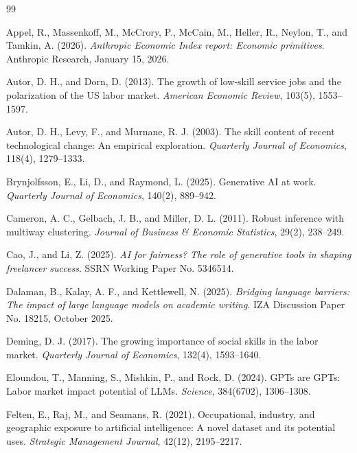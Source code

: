 \documentclass[11pt]{amsart}
\begin{document}
\FloatBarrier
\begin{thebibliography}{99}

Appel, R., Massenkoff, M., McCrory, P., McCain, M., Heller, R., Neylon, T., and Tamkin, A. (2026). \emph{Anthropic Economic Index report: Economic primitives}. Anthropic Research, January 15, 2026.

Autor, D. H., and Dorn, D. (2013). The growth of low-skill service jobs and the polarization of the US labor market. \emph{American Economic Review}, 103(5), 1553--1597.

Autor, D. H., Levy, F., and Murnane, R. J. (2003). The skill content of recent technological change: An empirical exploration. \emph{Quarterly Journal of Economics}, 118(4), 1279--1333.

Brynjolfsson, E., Li, D., and Raymond, L. (2025). Generative AI at work. \emph{Quarterly Journal of Economics}, 140(2), 889--942.

Cameron, A. C., Gelbach, J. B., and Miller, D. L. (2011). Robust inference with multiway clustering. \emph{Journal of Business \& Economic Statistics}, 29(2), 238--249.

Cao, J., and Li, Z. (2025). \emph{AI for fairness? The role of generative tools in shaping freelancer success}. SSRN Working Paper No. 5346514.

Dalaman, B., Kalay, A. F., and Kettlewell, N. (2025). \emph{Bridging language barriers: The impact of large language models on academic writing}. IZA Discussion Paper No. 18215, October 2025.

Deming, D. J. (2017). The growing importance of social skills in the labor market. \emph{Quarterly Journal of Economics}, 132(4), 1593--1640.

Eloundou, T., Manning, S., Mishkin, P., and Rock, D. (2024). GPTs are GPTs: Labor market impact potential of LLMs. \emph{Science}, 384(6702), 1306--1308.

Felten, E., Raj, M., and Seamans, R. (2021). Occupational, industry, and geographic exposure to artificial intelligence: A novel dataset and its potential uses. \emph{Strategic Management Journal}, 42(12), 2195--2217.


\end{thebibliography}
\end{document}
